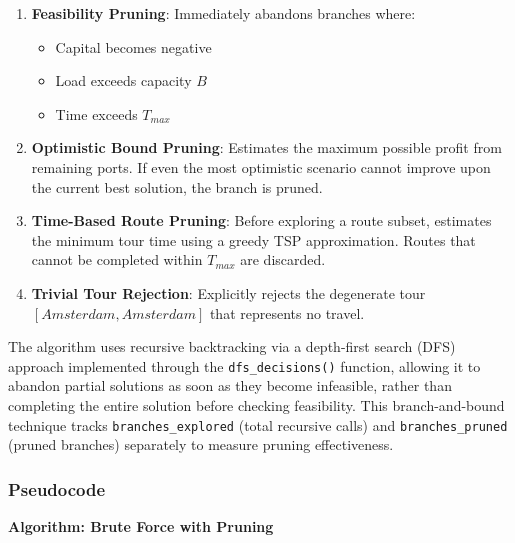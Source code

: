\documentclass[12pt]{article}
\begin{document}
\begin{enumerate}
    \item \textbf{Feasibility Pruning}: Immediately abandons branches where:
    \begin{itemize}
        \item Capital becomes negative
        \item Load exceeds capacity $B$
        \item Time exceeds $T_{max}$
    \end{itemize}
    
    \item \textbf{Optimistic Bound Pruning}: Estimates the maximum possible profit from remaining ports. If even the most optimistic scenario cannot improve upon the current best solution, the branch is pruned.
    
    \item \textbf{Time-Based Route Pruning}: Before exploring a route subset, estimates the minimum tour time using a greedy TSP approximation. Routes that cannot be completed within $T_{max}$ are discarded.
    
    \item \textbf{Trivial Tour Rejection}: Explicitly rejects the degenerate tour $[Amsterdam, Amsterdam]$ that represents no travel.
\end{enumerate}

The algorithm uses recursive backtracking via a depth-first search (DFS) approach \cite{horowitz1978} implemented through the \texttt{dfs\_decisions()} function, allowing it to abandon partial solutions as soon as they become infeasible, rather than completing the entire solution before checking feasibility. This branch-and-bound technique \cite{lawler1966} tracks \texttt{branches\_explored} (total recursive calls) and \texttt{branches\_pruned} (pruned branches) separately to measure pruning effectiveness.

\subsubsection{Pseudocode}

\textbf{Algorithm: Brute Force with Pruning}
\end{document}
